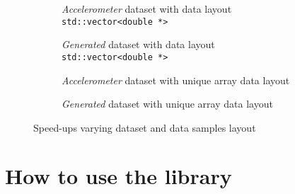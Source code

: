 \documentclass{article}
\begin{document}
\begin{figure}[H]
\begin{minipage}{\linewidth}
\centering
\begin{subfigure}[t]{.47\linewidth}%
%
\setlength{\abovecaptionskip}{0pt}%
\caption*{\textit{Accelerometer} dataset with data layout \texttt{std::vector<double *>}}%
\end{subfigure}%
%
\hspace{5mm}%
%
\begin{subfigure}[t]{.47\linewidth}%
%
\setlength{\abovecaptionskip}{0pt}%
\caption*{\textit{Generated} dataset with data layout \texttt{std::vector<double *>}}%
\end{subfigure}%
\end{minipage}
%
%
\begin{minipage}{\linewidth}
\centering
\begin{subfigure}[t]{.47\linewidth}%
%
\setlength{\abovecaptionskip}{0pt}%
\caption*{\textit{Accelerometer} dataset with unique array data layout}%
\end{subfigure}%
%
\hspace{5mm}%
%
\begin{subfigure}[t]{.47\linewidth}%
%
\setlength{\abovecaptionskip}{0pt}%
\caption*{\textit{Generated} dataset with unique array data layout}%
\end{subfigure}%
\end{minipage}
%
%
\begin{subfigure}{.47\linewidth}%
\hspace*{6pt}
%
\setlength{\abovecaptionskip}{0pt}%
\end{subfigure}%
\setlength{\abovecaptionskip}{4pt}%
\caption*{Speed-ups varying dataset and data samples layout}
\end{figure}

\vspace{-14pt}
\hypertarget{how-to-use-the-library}{
\section{How to use the library}
\label{how-to-use-the-library}}

\end{document}
